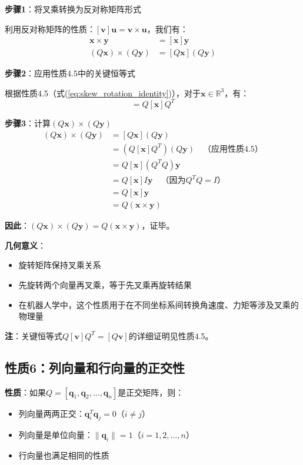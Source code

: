 \documentclass[12pt,a4paper]{article}
\begin{document}
\textbf{步骤1}：将叉乘转换为反对称矩阵形式

利用反对称矩阵的性质：$[\bm{v}] \bm{u} = \bm{v} \times \bm{u}$，我们有：
\begin{align}
\bm{x} \times \bm{y} &= [\bm{x}] \bm{y} \\
(Q\bm{x}) \times (Q\bm{y}) &= [Q\bm{x}] (Q\bm{y})
\end{align}

\textbf{步骤2}：应用性质4.5中的关键恒等式

根据性质4.5（式(\ref{eq:skew_rotation_identity})），对于$\bm{x} \in \mathbb{R}^3$，有：
\begin{equation}
[Q\bm{x}] = Q[\bm{x}]Q^T
\end{equation}

\textbf{步骤3}：计算$(Q\bm{x}) \times (Q\bm{y})$
\begin{align}
(Q\bm{x}) \times (Q\bm{y}) &= [Q\bm{x}] (Q\bm{y}) \\
&= (Q[\bm{x}]Q^T)(Q\bm{y}) \quad \text{（应用性质4.5）} \\
&= Q[\bm{x}](Q^T Q)\bm{y} \\
&= Q[\bm{x}] I \bm{y} \quad \text{（因为$Q^T Q = I$）} \\
&= Q[\bm{x}] \bm{y} \\
&= Q(\bm{x} \times \bm{y})
\end{align}

\textbf{因此}：$(Q\bm{x}) \times (Q\bm{y}) = Q(\bm{x} \times \bm{y})$，证毕。

\textbf{几何意义}：
\begin{itemize}
\item 旋转矩阵保持叉乘关系
\item 先旋转两个向量再叉乘，等于先叉乘再旋转结果
\item 在机器人学中，这个性质用于在不同坐标系间转换角速度、力矩等涉及叉乘的物理量
\end{itemize}

\textbf{注}：关键恒等式$Q[\bm{v}]Q^T = [Q\bm{v}]$的详细证明见性质4.5。

\subsection{性质6：列向量和行向量的正交性}

\textbf{性质}：如果$Q = [\bm{q}_1, \bm{q}_2, \ldots, \bm{q}_n]$是正交矩阵，则：
\begin{itemize}
\item 列向量两两正交：$\bm{q}_i^T \bm{q}_j = 0$（$i \neq j$）
\item 列向量是单位向量：$\|\bm{q}_i\| = 1$（$i = 1, 2, \ldots, n$）
\item 行向量也满足相同的性质
\end{itemize}
\end{document}
